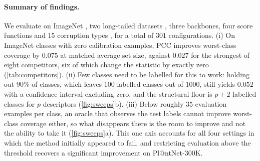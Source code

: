 \paragraph{Summary of findings.} We evaluate on ImageNet \cite{russakovsky2015imagenet}, two
long-tailed datasets \cite{garcin2021plantnet,vanhorn2018inaturalist}, three backbones, four
score functions and $15$ corruption types \cite{hendrycks2019benchmarking}, for a total of
$301$ configurations. (i) On ImageNet classes with zero calibration examples, PCC improves
worst-class coverage by $0.075$ at matched average set size, against $0.027$ for the strongest
of eight competitors, six of which change the statistic by exactly zero
(\cref{tab:competitors}). (ii) Few classes need to be labelled for this to work: holding out
$90\%$ of classes, which leaves $100$ labelled classes out of $1000$, still yields $0.052$
with a confidence interval excluding zero, and the structural floor is $p+2$ labelled classes
for $p$ descriptors (\cref{fig:sweeps}b). (iii) Below roughly $35$ evaluation examples per
class, an oracle that observes the test labels cannot improve worst-class coverage either, so
what disappears there is the room to improve and not the ability to take it
(\cref{fig:sweeps}a). This one axis accounts for all four settings in which the method
initially appeared to fail, and restricting evaluation above the threshold recovers a
significant improvement on Pl@ntNet-300K.
